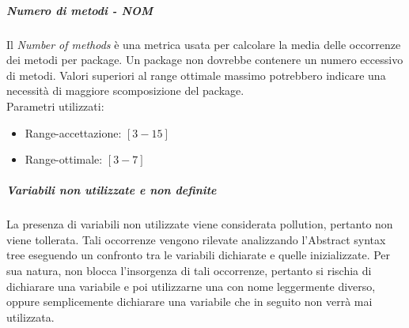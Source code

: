 \subparagraph{Numero di metodi - NOM}
Il \emph{Number of methods} è una metrica usata per calcolare la media
delle occorrenze dei metodi per package. Un package non dovrebbe
contenere un numero eccessivo di metodi. Valori superiori al range
ottimale massimo potrebbero indicare una necessità di maggiore
scomposizione del package. \\

Parametri utilizzati:
\begin{itemize}
\item Range-accettazione: $[3 - 15]$
\item Range-ottimale: $[3 - 7]$
\end{itemize}

\subparagraph{Variabili non utilizzate e non definite}
La presenza di variabili non utilizzate viene considerata pollution, pertanto non viene tollerata.
Tali occorrenze vengono rilevate analizzando l’Abstract syntax tree
eseguendo un confronto tra le variabili  dichiarate e quelle
inizializzate. Per sua natura,  non blocca
l’insorgenza di tali occorrenze, pertanto si rischia di dichiarare una
variabile  e poi utilizzarne una
con nome leggermente diverso, oppure semplicemente dichiarare una variabile che in seguito non
verrà mai utilizzata.\\

